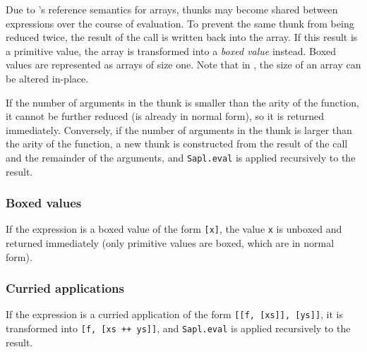 Due to \JS's reference semantics for arrays, thunks may become shared between 
expressions over the course of evaluation. To prevent the same thunk from being 
reduced twice, the result of the call is written back into the array. If this
result is a primitive value, the array is transformed into a \emph{boxed value}
instead. Boxed values are represented as arrays of size one. Note that in \JS,
the size of an array can be altered in-place.

If the number of arguments in the thunk is smaller than the arity of the 
function, it cannot be further reduced (is already in normal form), so it is
returned immediately. Conversely, if the number of arguments in the thunk is
larger than the arity of the function, a new thunk is constructed from the
result of the call and the remainder of the arguments, and \texttt{Sapl.eval}
is applied recursively to the result.

\subsubsection{Boxed values}
If the expression is a boxed value of the form \texttt{[x]}, the value 
\texttt{x} is unboxed and returned immediately (only primitive values are boxed,
which are in normal form).

\subsubsection{Curried applications}
If the expression is a curried application of the form
\texttt{[[f, [xs]], [ys]]}, it is transformed into  \texttt{[f, [xs ++ ys]]}, 
and \texttt{Sapl.eval} is applied recursively to the result.

